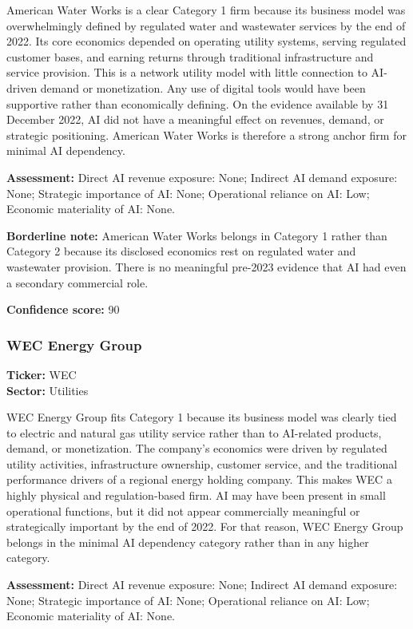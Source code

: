 \documentclass{article}
\begin{document}
American Water Works is a clear Category 1 firm because its business model was overwhelmingly defined by regulated water and wastewater services by the end of 2022. Its core economics depended on operating utility systems, serving regulated customer bases, and earning returns through traditional infrastructure and service provision. This is a network utility model with little connection to AI-driven demand or monetization. Any use of digital tools would have been supportive rather than economically defining. On the evidence available by 31 December 2022, AI did not have a meaningful effect on revenues, demand, or strategic positioning. American Water Works is therefore a strong anchor firm for minimal AI dependency.

\textbf{Assessment:} Direct AI revenue exposure: None; Indirect AI demand exposure: None; Strategic importance of AI: None; Operational reliance on AI: Low; Economic materiality of AI: None.

\textbf{Borderline note:} American Water Works belongs in Category 1 rather than Category 2 because its disclosed economics rest on regulated water and wastewater provision. There is no meaningful pre-2023 evidence that AI had even a secondary commercial role.

\textbf{Confidence score:} 90

\subsubsection*{WEC Energy Group}
\textbf{Ticker:} WEC \\
\textbf{Sector:} Utilities

WEC Energy Group fits Category 1 because its business model was clearly tied to electric and natural gas utility service rather than to AI-related products, demand, or monetization. The company’s economics were driven by regulated utility activities, infrastructure ownership, customer service, and the traditional performance drivers of a regional energy holding company. This makes WEC a highly physical and regulation-based firm. AI may have been present in small operational functions, but it did not appear commercially meaningful or strategically important by the end of 2022. For that reason, WEC Energy Group belongs in the minimal AI dependency category rather than in any higher category.

\textbf{Assessment:} Direct AI revenue exposure: None; Indirect AI demand exposure: None; Strategic importance of AI: None; Operational reliance on AI: Low; Economic materiality of AI: None.
\end{document}
